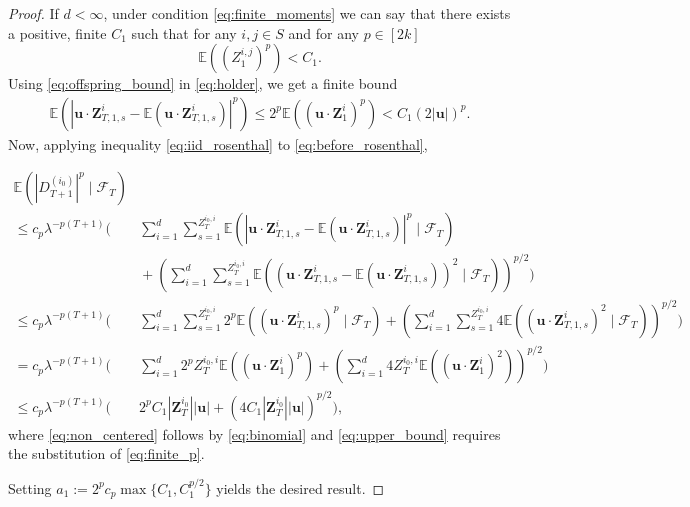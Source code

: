 \documentclass[preprint,3p,12pt]{elsarticle}
\theoremstyle{definition}
\begin{document}
\begin{proof}
    If $d < \infty$, under condition \eqref{eq:finite_moments} we can say
    that there exists a positive, finite $C_1$ such that for any $i,j \in S$ and for any $p \in [2k]$
    \begin{equation}
        \mathbb{E}((Z_1^{i,j})^p) < C_1. \label{eq:offspring_bound} 
    \end{equation}
Using \eqref{eq:offspring_bound} in \eqref{eq:holder}, we get a finite bound %
    \begin{align}
     \mathbb{E}(|\boldsymbol{u} \cdot \boldsymbol{Z}_{T,1,s}^{i} - \mathbb{E}(\boldsymbol{u} \cdot \boldsymbol{Z}_{T,1,s}^{i})|^p) \leq 2^p\mathbb{E}((\boldsymbol{u} \cdot \boldsymbol{Z}_1^{i} )^p) < C_1(2 |\boldsymbol{u}|)^p. \label{eq:finite_p}
\end{align}
Now, applying inequality \eqref{eq:iid_rosenthal} to \eqref{eq:before_rosenthal},

\begin{align}
\mathbb{E}(|D_{T+1}^{(i_0)}|^p\mid\mathcal{F}_{T}) \nonumber\\
    {}\le c_p \lambda^{-p(T+1)}\Bigg( & \sum_{i=1}^d \sum_{s=1}^{Z_T^{i_0, i}} \mathbb{E}(|\boldsymbol{u} \cdot \boldsymbol{Z}_{T,1,s}^{i} - \mathbb{E}(\boldsymbol{u} \cdot \boldsymbol{Z}_{T,1,s}^{i})|^p\mid\mathcal{F}_{T})\nonumber\\
    &{}+ \left(\sum_{i=1}^d \sum_{s=1}^{Z_T^{i_0, i}} \mathbb{E}((\boldsymbol{u} \cdot \boldsymbol{Z}_{T,1,s}^{i} - \mathbb{E}(\boldsymbol{u} \cdot \boldsymbol{Z}_{T,1,s}^{i}))^2\mid\mathcal{F}_{T})\right)^{p/2}\Bigg) \nonumber\\
     \le c_p \lambda^{-p(T+1)}\Bigg(&\sum_{i=1}^d \sum_{s=1}^{Z_T^{i_0, i}} 2^p\mathbb{E}((\boldsymbol{u} \cdot \boldsymbol{Z}_{T,1,s}^{i})^p \mid\mathcal{F}_{T}) 
    + \left(\sum_{i=1}^d \sum_{s=1}^{Z_T^{i_0, i}} 4\mathbb{E}((\boldsymbol{u} \cdot \boldsymbol{Z}_{T,1,s}^{i})^2\mid\mathcal{F}_{T})\right)^{p/2}\Bigg) \label{eq:non_centered} \\
    {}= c_p \lambda^{-p(T+1)}\Bigg(&\sum_{i=1}^d  2^p Z_T^{i_0, i}\mathbb{E}((\boldsymbol{u} \cdot \boldsymbol{Z}_{1}^{i})^p) 
    + \left(\sum_{i=1}^d 4 Z_T^{i_0, i} \mathbb{E}((\boldsymbol{u} \cdot \boldsymbol{Z}_{1}^{i})^2)\right)^{p/2}\Bigg) \\%
     {}\le c_p \lambda^{-p(T+1)}\big(&2^p C_1|\boldsymbol{Z}_T^{i_0}|  |\boldsymbol{u}| + \left(4 C_1|\boldsymbol{Z}_T^{i_0}|  |\boldsymbol{u}|\right)^{p/2}\big), \label{eq:upper_bound}
\end{align}
 where \eqref{eq:non_centered} follows by \eqref{eq:binomial} and \ref{eq:upper_bound} requires the substitution of \eqref{eq:finite_p}.

Setting $a_1 := 2^p c_p \max\{C_1, C_1^{p/2}\}$ yields the desired result.
\end{proof}
\end{document}
